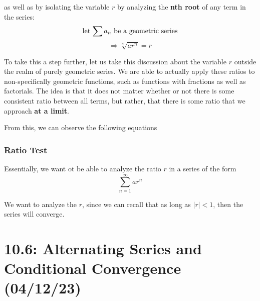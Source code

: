 \documentclass{report}
\begin{document}
\begin{sloppypar}
as well as by isolating the variable $ r $ by analyzing the \textbf{nth root} of any
term in the series:
\[ \textrm{let $ \sum a_{n}$ be a geometric series}\]
\[ \Rightarrow \sqrt[n]{ar^{n}} = r \]

To take this a step further, let us take this discussion
about the variable $ r $ outside the realm of purely
geometric series. We are able to actually apply these ratios
to non-specifically geometric functions, such as functions
with fractions as well as factorials. The idea is that it does
not matter whether or not there is some consistent ratio between
all terms, but rather, that there is some ratio that we approach
\textbf{at a limit}.

From this, we can observe the following equations


\subsection{Ratio Test}
Essentially, we want ot be able to analyze the ratio $ r $ in a
series of the form
\[ \sum_{n=1}^{\infty} ar^{n} \]

We want to analyze the $ r $, since we can recall that as long as $ |r| < 1 $, then
the series will converge.

\begin{center}
\end{center}


\chapter{10.6: Alternating Series and Conditional Convergence (04/12/23)}


\end{sloppypar}
\end{document}
